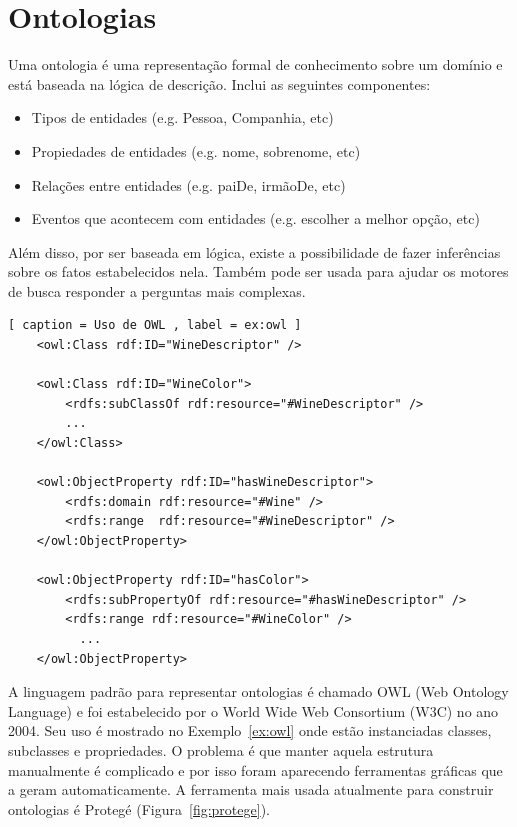 \section{Ontologias}
\label{sec:ontology}

Uma ontologia é uma representação formal de conhecimento sobre um domínio e está baseada na lógica de descrição. Inclui as seguintes componentes:

\begin{itemize}
	\item Tipos de entidades (e.g. Pessoa, Companhia, etc)
	\item Propiedades de entidades (e.g. nome, sobrenome, etc)
	\item Relações entre entidades (e.g. paiDe, irmãoDe, etc)
	\item Eventos que acontecem com entidades (e.g. escolher a melhor opção, etc)
\end{itemize}

Além disso, por ser baseada em lógica, existe a possibilidade de fazer inferências sobre os fatos estabelecidos nela. Também pode ser usada para ajudar os motores de busca responder a perguntas mais complexas.

\begin{lstlisting}[ caption = Uso de OWL , label = ex:owl ]
	<owl:Class rdf:ID="WineDescriptor" />
	
	<owl:Class rdf:ID="WineColor">
		<rdfs:subClassOf rdf:resource="#WineDescriptor" />
		...
	</owl:Class>

	<owl:ObjectProperty rdf:ID="hasWineDescriptor">
		<rdfs:domain rdf:resource="#Wine" />
		<rdfs:range  rdf:resource="#WineDescriptor" />
	</owl:ObjectProperty>

	<owl:ObjectProperty rdf:ID="hasColor">
		<rdfs:subPropertyOf rdf:resource="#hasWineDescriptor" />
		<rdfs:range rdf:resource="#WineColor" />
		  ...
	</owl:ObjectProperty>
\end{lstlisting}

A linguagem padrão para representar ontologias é chamado OWL (Web Ontology Language) e foi estabelecido por o World Wide Web Consortium (W3C) no ano 2004. Seu uso é mostrado no Exemplo~\ref{ex:owl} onde estão instanciadas classes, subclasses e propriedades. O problema é que manter aquela estrutura manualmente é complicado e por isso foram aparecendo ferramentas gráficas que a geram automaticamente. A ferramenta mais usada atualmente para construir ontologias é Protegé (Figura~\ref{fig:protege}).

